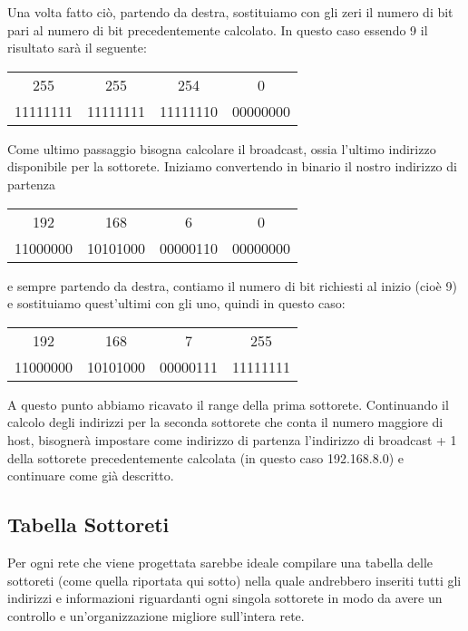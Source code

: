 Una volta fatto ciò, partendo da destra, sostituiamo con gli zeri il numero di bit pari al numero di bit precedentemente calcolato. In questo caso essendo 9 il risultato sarà il seguente:

\begin{center}
    \begin{tabular}{c@{.}c@{.}c@{.}c}
        255 & 255 & 254 & 0\\
        11111111 & 11111111 & 11111110 & 00000000
    \end{tabular}
\end{center}

Come ultimo passaggio bisogna calcolare il broadcast, ossia l'ultimo indirizzo disponibile per la sottorete. Iniziamo convertendo in binario il nostro indirizzo di partenza
%
\begin{center}
    \begin{tabular}{c@{.}c@{.}c@{.}c}
        192 & 168 & 6 & 0\\
        11000000 & 10101000 & 00000110 & 00000000
    \end{tabular}
\end{center}
%
e sempre partendo da destra, contiamo il numero di bit richiesti al inizio (cioè 9) e sostituiamo quest'ultimi con gli uno, quindi in questo caso:

\begin{center}
    \begin{tabular}{c@{.}c@{.}c@{.}c}
        192 & 168 & 7 & 255\\
        11000000 & 10101000 & 00000111 & 11111111
    \end{tabular}
\end{center}

A questo punto abbiamo ricavato il range della prima sottorete. Continuando il calcolo degli indirizzi per la seconda sottorete che conta il numero maggiore di host, bisognerà impostare come indirizzo di partenza l'indirizzo di broadcast + 1 della sottorete precedentemente calcolata (in questo caso 192.168.8.0) e continuare come già descritto.

\subsection{Tabella Sottoreti}
Per ogni rete che viene progettata sarebbe ideale compilare una tabella delle sottoreti (come quella riportata qui sotto) nella quale andrebbero inseriti tutti gli indirizzi e informazioni riguardanti ogni singola sottorete in modo da avere un controllo e un'organizzazione migliore sull'intera rete.

